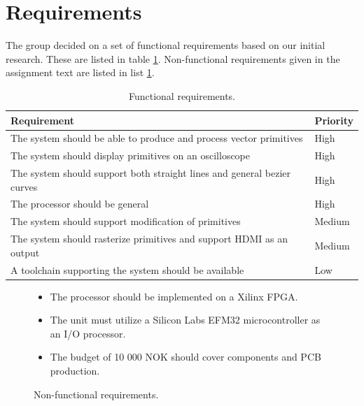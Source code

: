 \section{Requirements}

The group decided on a set of functional requirements based on our initial research. These are listed in table \ref{tbl:func_req}.
Non-functional requirements given in the assignment text are listed in list \ref{lst:non_func_req}.

\begin{table}[h!]
    \begin{tabular}{|l|l|}
        \hline
        Requirement                                                             & Priority \\ \hline
        The system should be able to produce and process vector primitives      & High     \\ \hline
        The system should display primitives on an oscilloscope                 & High     \\ \hline
        The system should support both straight lines and general bezier curves & High     \\ \hline
        The processor should be general                                         & High     \\ \hline
        The system should support modification of primitives                    & Medium   \\ \hline
        The system should rasterize primitives and support HDMI as an output    & Medium   \\ \hline
        A toolchain supporting the system should be available                   & Low      \\ \hline
    \end{tabular}
    \caption{Functional requirements.}
    \label{tbl:func_req}
\end{table}

\begin{figure}[h!]
\begin{itemize}
        \item The processor should be implemented on a Xilinx FPGA.
        \item The unit must utilize a Silicon Labs EFM32 microcontroller as an I/O processor.
        \item The budget of 10 000 NOK should cover components and PCB production.
\end{itemize}
        \label{lst:non_func_req}
        \caption{Non-functional requirements.}
\end{figure}

